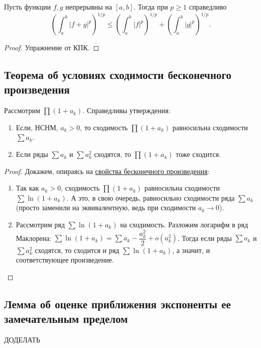 \begin{ntheorem}
	Пусть функции \(f, g\) непрерывны на \([a, b]\). Тогда при \(p \geqslant 1\) справедливо \[
	\left(\int_a^b |f + g|^p \right)^{1/p} \leqslant \left(\int_a^b |f|^p \right)^{1/p} + \left(\int_a^b |g|^p \right)^{1/p}.
	\]
\end{ntheorem}
\begin{proof}
	Упражнение от КПК.
\end{proof}

\subsection{Теорема об условиях сходимости бесконечного произведения}

\begin{theorem}
	Рассмотрим \(\prod (1 + a_k)\). Справедливы утверждения:
	\begin{enumerate}
		\item Если, НСНМ, \(a_k > 0\), то сходимость \(\prod (1 + a_k)\) равносильна сходимости \(\sum a_k\).
		\item Если ряды \(\sum a_k\) и \(\sum a_k^2\) сходятся, то \(\prod (1 + a_k)\) тоже сходится.
	\end{enumerate}
\end{theorem}
\begin{proof}
	Докажем, опираясь на \hyperlink{besk}{свойства бесконечного произведения}:
	\begin{enumerate}
		\item Так как \(a_k > 0\), сходимость \(\prod (1 + a_k)\) равносильна сходимости \(\sum \ln (1 + a_k)\). А это, в свою очередь, равносильно сходимости ряда \(\sum a_k\) (просто заменили на эквивалентную, ведь при сходимости \(a_k \to 0\)).
		\item Рассмотрим ряд \(\sum \ln (1 + a_k)\) на сходимость. Разложим логарифм в ряд Маклорена: \(\sum \ln (1 + a_k) = \sum a_k - \dfrac{a_k^2}{2} + o(a_k^2)\). Тогда если ряды \(\sum a_k\) и \(\sum a_k^2\) сходятся, то сходится и ряд \(\sum \ln (1 + a_k)\), а значит, и соответствующее произведение.
	\end{enumerate}
\end{proof}

\subsection{Лемма об оценке приближения экспоненты ее замечательным пределом}

ДОДЕЛАТЬ

